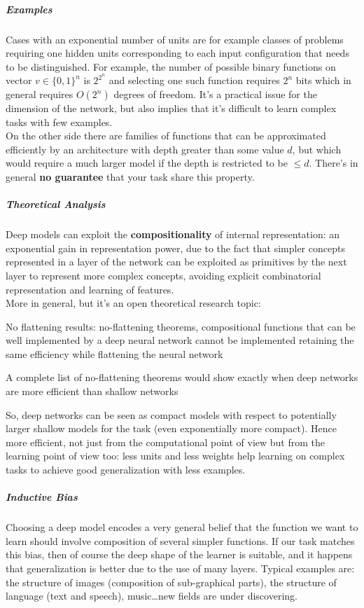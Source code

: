 \documentclass[10pt]{report}
\begin{document}
\subparagraph{Examples} Cases with an exponential number of units are for example classes of problems requiring one hidden units corresponding to each input configuration that needs to be distinguished. For example, the number of possible binary functions on vector $v\in\{0,1\}^n$ is $2^{2^n}$ and selecting one such function requires $2^n$ bits which in general requires $O(2^n)$ degrees of freedom. It's a practical issue for the dimension of the network, but also implies that it's difficult to learn complex tasks with few examples.\\
On the other side there are families of functions that can be approximated efficiently by an architecture with depth greater than some value $d$, but which would require a much larger model if the depth is restricted to be $\leq d$. There's in general \textbf{no guarantee} that your task share this property.
\subparagraph{Theoretical Analysis} Deep models can exploit the \textbf{compositionality} of internal representation: an exponential gain in representation power, due to the fact that simpler concepts represented in a layer of the network can be exploited as primitives by the next layer to represent more complex concepts, avoiding explicit combinatorial representation and learning of features.\\
More in general, but it's an open theoretical research topic:
\begin{list}{}{}
	\item No flattening results: no-flattening theorems, compositional functions that can be well implemented by a deep neural network cannot be implemented retaining the same efficiency while flattening the neural network
	\item A complete list of no-flattening theorems would show exactly when deep networks are more efficient than shallow networks
\end{list}
So, deep networks can be seen as compact models with respect to potentially larger shallow models for the task (even exponentially more compact). Hence more efficient, not just from the computational point of view but from the learning point of view too: less units and less weights help learning on complex tasks to achieve good generalization with less examples.
\subparagraph{Inductive Bias} Choosing a deep model encodes a very general belief that the function we want to learn should involve composition of several simpler functions. If our task matches this bias, then of course the deep shape of the learner is suitable, and it happens that generalization is better due to the use of many layers. Typical examples are: the structure of images (composition of sub-graphical parts), the structure of language (text and speech), music\ldots new fields are under discovering.\\
\end{document}
